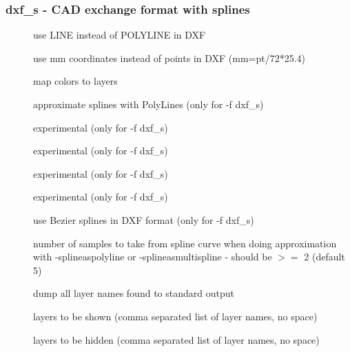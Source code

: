 \documentclass[english,a4paper]{article}
\begin{document}
\subsubsection{dxf\_s - CAD exchange format with splines}
\begin{description}
\item[] 
use LINE instead of POLYLINE in DXF


\item[] 
use mm coordinates instead of points in DXF (mm=pt/72*25.4)


\item[] 
map colors to layers


\item[] 
approximate splines with PolyLines (only for -f dxf\_s)


\item[] 
experimental (only for -f dxf\_s)


\item[] 
experimental (only for -f dxf\_s)


\item[] 
experimental (only for -f dxf\_s)


\item[] 
experimental (only for -f dxf\_s)


\item[] 
use Bezier splines in DXF format (only for -f dxf\_s)


\item[] 
number of samples to take from spline curve when doing approximation with -splineaspolyline or -splineasmultispline - should be $>=$ 2 (default 5)


\item[] 
dump all layer names found to standard output


\item[] 
layers to be shown (comma separated list of layer names, no space)


\item[] 
layers to be hidden (comma separated list of layer names, no space)


\end{description}
\end{document}
